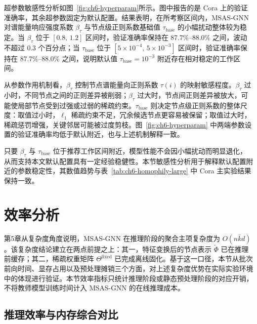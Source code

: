 超参数敏感性分析如图~\ref{fig:ch6-hyperparam}所示。图中报告的是 Cora 上的验证准确率，其余超参数固定为默认配置。结果表明，在所考察区间内，MSAS-GNN 对谱能量响应强度系数 $\beta_\tau$ 与节点级正则系数基础值 $\tau_{\text{base}}$ 的小幅扰动整体较为稳定。当 $\beta_\tau$ 位于 $[0.8,\,1.2]$ 区间时，验证准确率保持在 87.7\%--88.0\% 之间，波动不超过 0.3 个百分点；当 $\tau_{\text{base}}$ 位于 $[5\times10^{-4},\,5\times10^{-3}]$ 区间时，验证准确率保持在 87.7\%--88.0\% 之间，说明默认值 $\tau_{\text{base}}=10^{-3}$ 附近存在相对稳定的工作区间。

从参数作用机制看，$\beta_\tau$ 控制节点谱能量向正则系数 $\tau(i)$ 的映射敏感程度。$\beta_\tau$ 过小时，不同节点之间的正则差异被削弱；$\beta_\tau$ 过大时，节点间正则差异被放大，可能使局部节点受到过强或过弱的稀疏约束。$\tau_{\text{base}}$ 则决定节点级正则系数的整体尺度：取值过小时，$\ell_1$ 稀疏约束不足，冗余候选节点更容易被保留；取值过大时，稀疏惩罚增强，关键邻居可能被过度剪枝。图~\ref{fig:ch6-hyperparam} 中两端参数设置的验证准确率均低于默认附近，也与上述机制解释一致。

只要 $\beta_\tau$ 与 $\tau_{\text{base}}$ 位于推荐工作区间附近，模型性能不会因小幅扰动而明显退化，从而支持本文默认配置具有一定经验稳健性。本节敏感性分析用于解释默认配置附近的参数稳定性，其数值趋势与表~\ref{tab:ch6-homophily-large} 中 Cora 主实验结果保持一致。

\section{效率分析}
\label{sec:ch6-efficiency}

第5章从复杂度角度说明，MSAS-GNN 在推理阶段的聚合主项复杂度为 $O(n\bar{k}d)$。该复杂度结论建立在两点前提之上：其一，特征变换后的节点表示 $\tilde{\Phi}$ 已在推理前缓存；其二，稀疏权重矩阵 $\Theta^{\mathrm{fixed}}$ 已完成离线固化。基于这一口径，本节从批次前向时间、显存占用以及预处理摊销三个方面，对上述复杂度优势在实际实验环境中的体现进行验证。本节效率指标只统计推理阶段或静态预处理阶段的对应开销，不将教师模型训练时间计入 MSAS-GNN 的在线推理成本。

\subsection{推理效率与内存综合对比}
\label{subsec:ch6-infer}

